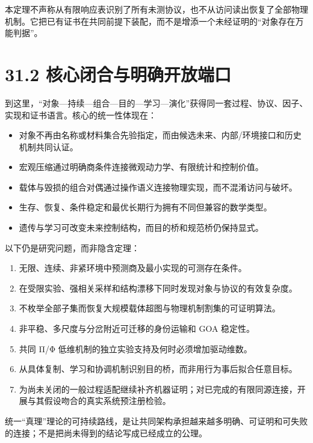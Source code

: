 \documentclass[
  11pt,
  oneside]{book}
\providecommand{\tightlist}{%
  \setlength{\itemsep}{0pt}\setlength{\parskip}{0pt}}
\begin{document}
本定理不声称从有限响应表识别了所有未测协议，也不从访问读出恢复了全部物理机制。它把已有证书在共同前提下装配，而不是增添一个未经证明的``对象存在万能判据''。

\section{31.2 核心闭合与明确开放端口}\label{ux6838ux5fc3ux95edux5408ux4e0eux660eux786eux5f00ux653eux7aefux53e3}

到这里，``对象---持续---组合---目的---学习---演化''获得同一套过程、协议、因子、实现和证书语言。核心的统一性体现在：

\begin{itemize}
\tightlist
\item
  对象不再由名称或材料集合先验指定，而由候选未来、内部/环境接口和历史机制共同认证。
\item
  宏观压缩通过明确商条件连接微观动力学、有限统计和控制价值。
\item
  载体与毁损的组合对偶通过操作语义连接物理实现，而不混淆访问与破坏。
\item
  生存、恢复、条件稳定和最优长期行为拥有不同但兼容的数学类型。
\item
  遗传与学习可改变未来控制结构，而目的桥和规范桥仍保持显式。
\end{itemize}

以下仍是研究问题，而非隐含定理：

\begin{enumerate}
\def\labelenumi{\arabic{enumi}.}
\tightlist
\item
  无限、连续、非紧环境中预测商及最小实现的可测存在条件。
\item
  在受限实验、强相关采样和结构漂移下同时发现对象与协议的有效复杂度。
\item
  不枚举全部子集而恢复大规模载体超图与物理机制割集的可证明算法。
\item
  非平稳、多尺度与分岔附近可迁移的身份运输和 GOA 稳定性。
\item
  共同 Π/Φ 低维机制的独立实验支持及何时必须增加驱动维数。
\item
  从具体复制、学习和协调机制识别目的桥，而非用行为事后拟合任意目标。
\item
  为尚未关闭的一般过程适配继续补齐机器证明；对已完成的有限同源连接，开展与其假设吻合的真实系统预注册检验。
\end{enumerate}

统一``真理''理论的可持续路线，是让共同架构承担越来越多明确、可证明和可失败的连接；不是把尚未得到的结论写成已经成立的公理。
\end{document}
